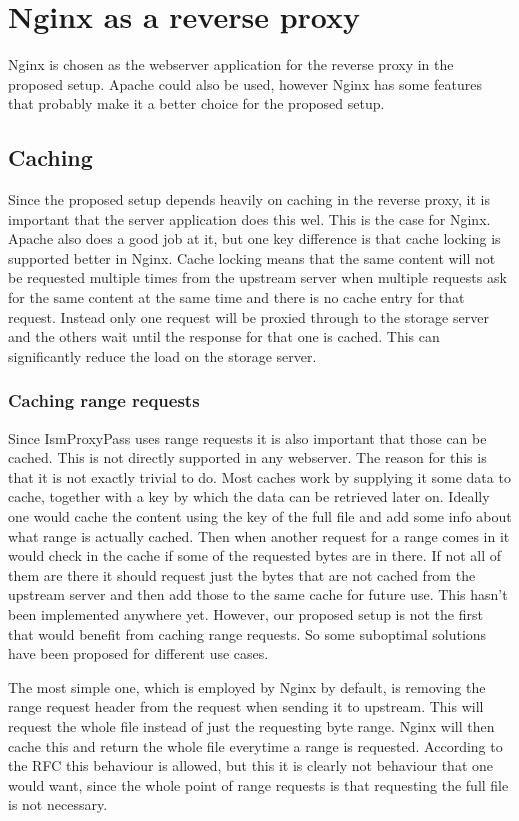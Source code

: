 \documentclass[twoside,openright]{uva-bachelor-thesis}
\begin{document}
\section{Nginx as a reverse proxy}
Nginx is chosen as the webserver application for the reverse proxy in the
proposed setup. Apache could also be used, however Nginx has some features that
probably make it a better choice for the proposed setup.

\subsection{Caching} \label{sec:caching}
Since the proposed setup depends heavily on caching in the reverse proxy, it is
important that the server application does this wel. This is the case for Nginx.
Apache also does a good job at it, but one key difference is that cache locking is
supported better in Nginx. Cache locking means that the same content will not be
requested multiple times from the upstream server when multiple requests ask for
the same content at the same time and there is no cache entry for that
request. Instead only one request will be proxied through to the storage server
and the others wait until the response for that one is cached. This can
significantly reduce the load on the storage server.



\subsubsection{Caching range requests}
Since IsmProxyPass uses range requests it is also important that those can be
cached. This is not directly supported in any webserver. The reason for
this is that it is not exactly trivial to do. Most caches work by supplying it
some data to cache, together with a key by which the data can be retrieved later
on.
Ideally one would cache the content using the key of the full file and add some
info about what range is actually cached. Then when another request for a range
comes in it would check in the cache if some of the requested bytes are in
there. If not all of them are there it should request just the bytes that are
not cached from the upstream server and then add those to the same cache for
future use. This hasn't been implemented anywhere yet. However, our proposed
setup is not the first that would benefit from caching range requests. So some
suboptimal solutions have been proposed for different use cases.

The most simple one, which is employed by Nginx by default,
is removing the range request header from the request when sending it to
upstream. This will request the whole file instead of just the requesting byte
range. Nginx will then cache this and return the whole file everytime a range is
requested. According to the RFC this behaviour is allowed, but this it is
clearly not behaviour that one would want, since the whole point of range
requests is that requesting the full file is not necessary.
\end{document}
